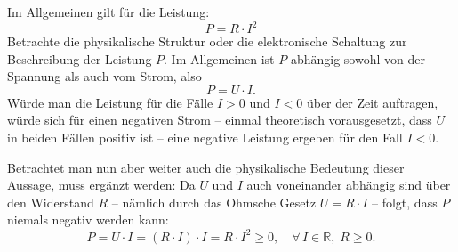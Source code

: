 ﻿\documentclass[12pt, a4paper]{article}
\begin{document}
	Im Allgemeinen gilt für die Leistung:
	\begin{equation}
		P = R \cdot I^2
		\label{eq:leistung_R}
	\end{equation}
	Betrachte die physikalische Struktur oder die elektronische Schaltung zur Beschreibung der Leistung $P$. Im Allgemeinen ist $P$ abhängig sowohl von der Spannung als auch vom Strom, also
	\begin{equation}
		P = U \cdot I.
		\label{eq:leistung_UI}
	\end{equation}
	Würde man die Leistung für die Fälle $I > 0$ und $I < 0$ über der Zeit auftragen, würde sich für einen negativen Strom -- einmal theoretisch vorausgesetzt, dass $U$ in beiden Fällen positiv ist -- eine negative Leistung ergeben für den Fall $I < 0$.
	
	Betrachtet man nun aber weiter auch die physikalische Bedeutung dieser Aussage, muss ergänzt werden: Da $U$ und $I$ auch voneinander abhängig sind über den Widerstand $R$ -- nämlich durch das Ohmsche Gesetz $U = R \cdot I$ -- folgt, dass $P$ niemals negativ werden kann:
	\begin{equation}
		P = U \cdot I = (R \cdot I) \cdot I = R \cdot I^2 \geq 0,
		\quad \forall\, I \in \mathbb{R},\; R \geq 0.
	\end{equation}
	
\end{document}
